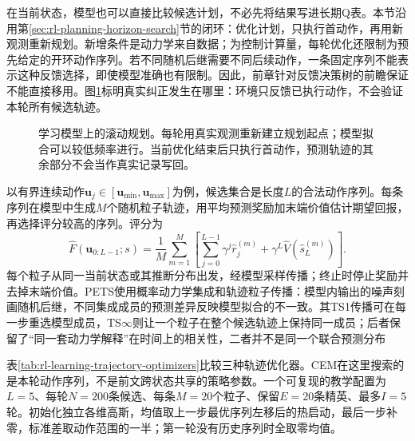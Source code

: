在当前状态，模型也可以直接比较候选计划，不必先将结果写进长期Q表。本节沿用第\ref{sec:rl-planning-horizon-search}节的闭环：优化计划，只执行首动作，再用新观测重新规划。新增条件是动力学来自数据；为控制计算量，每轮优化还限制为预先给定的开环动作序列。若不同随机后继需要不同后续动作，一条固定序列不能表示这种反馈选择，即使模型准确也有限制。因此，前章针对反馈决策树的前瞻保证不能直接移用。图\ref{fig:rl-learning-mpc}标明真实纠正发生在哪里：环境只反馈已执行动作，不会验证本轮所有候选轨迹。

\begin{figure}[t]
  \centering
  
  \caption{学习模型上的滚动规划。每轮用真实观测重新建立规划起点；模型拟合可以较低频率进行。当前优化结束后只执行首动作，预测轨迹的其余部分不会当作真实记录写回。}
  \label{fig:rl-learning-mpc}
\end{figure}

以有界连续动作$\bm u_j\in[\bm u_{\min},\bm u_{\max}]$为例，候选集合是长度$L$的合法动作序列。每条序列在模型中生成$M$个随机粒子轨迹，用平均预测奖励加末端价值估计期望回报，再选择评分较高的序列。评分为
\begin{equation}
  \widehat F(\bm u_{0:L-1};s)
  =\frac1M\sum_{m=1}^{M}
  \left[\sum_{j=0}^{L-1}\gamma^j\widehat r_j^{(m)}
          +\gamma^L\widehat V(\widehat s_L^{(m)})\right].
  \label{eq:rl-learning-particle-mpc}
\end{equation}
每个粒子从同一当前状态或其推断分布出发，经模型采样传播；终止时停止奖励并去掉末端价值。PETS使用概率动力学集成和轨迹粒子传播：模型内输出的噪声刻画随机后继，不同集成成员的预测差异反映模型拟合的不一致。其TS1传播可在每一步重选模型成员，TS$\infty$则让一个粒子在整个候选轨迹上保持同一成员；后者保留了“同一套动力学解释”在时间上的相关性，二者并不是同一个联合预测分布

表\ref{tab:rl-learning-trajectory-optimizers}比较三种轨迹优化器。CEM在这里搜索的是本轮动作序列，不是前文跨状态共享的策略参数。一个可复现的教学配置为$L=5$、每轮$N=200$条候选、每条$M=20$个粒子、保留$E=20$条精英、最多$I=5$轮。初始化独立各维高斯，均值取上一步最优序列左移后的热启动，最后一步补零，标准差取动作范围的一半；第一轮没有历史序列时全取零均值。

